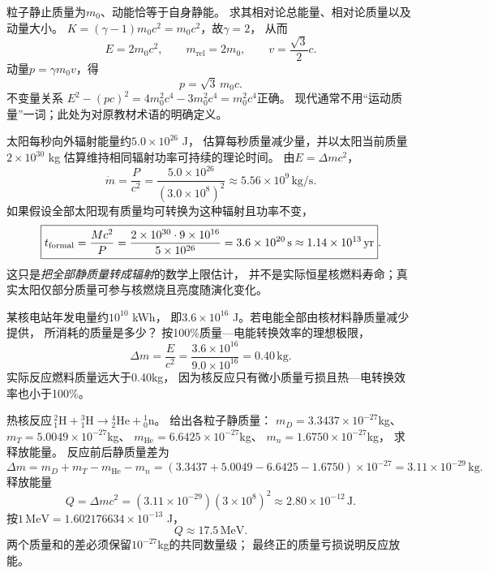 \problemtext 粒子静止质量为$m_0$、动能恰等于自身静能。
求其相对论总能量、相对论质量以及动量大小。
\workings
$K=(\gamma-1)m_0c^2=m_0c^2$，故$\gamma=2$，
从而
\[
\boxed{E=2m_0c^2},\qquad
\boxed{m_{\mathrm{rel}}=2m_0},\qquad
\boxed{v=\frac{\sqrt3}{2}c}.
\]
动量$p=\gamma m_0v$，得
\[
\boxed{p=\sqrt3\,m_0c}.
\]
\crosscheck 不变量关系
$E^2-(pc)^2=4m_0^2c^4-3m_0^2c^4=m_0^2c^4$正确。
现代通常不用“运动质量”一词；此处为对原教材术语的明确定义。

\problemtext 太阳每秒向外辐射能量约$5.0\times10^{26}$ J，
估算每秒质量减少量，并以太阳当前质量$2\times10^{30}$ kg
估算维持相同辐射功率可持续的理论时间。
\workings
由$E=\Delta mc^2$，
\[
\boxed{\dot m=\frac{P}{c^2}
=\frac{5.0\times10^{26}}{(3.0\times10^8)^2}
\approx5.56\times10^9\,\mathrm{kg/s}}.
\]
如果假设全部太阳现有质量均可转换为这种辐射且功率不变，
\[
\boxed{t_{\rm formal}=\frac{Mc^2}{P}
=\frac{2\times10^{30}\cdot9\times10^{16}}{5\times10^{26}}
=3.6\times10^{20}\,\mathrm s\approx1.14\times10^{13}\,\mathrm{yr}}.
\]
\crosscheck 这只是\emph{把全部静质量转成辐射}的数学上限估计，
并不是实际恒星核燃料寿命；真实太阳仅部分质量可参与核燃烧且亮度随演化变化。

\problemtext 某核电站年发电量约$10^{10}$ kWh，
即$3.6\times10^{16}$ J。若电能全部由核材料静质量减少提供，
所消耗的质量是多少？
\workings
按100\%质量—电能转换效率的理想极限，
\[
\boxed{\Delta m=\frac{E}{c^2}
=\frac{3.6\times10^{16}}{9.0\times10^{16}}
=0.40\,\mathrm{kg}}.
\]
\crosscheck 实际反应燃料质量远大于0.40kg，
因为核反应只有微小质量亏损且热—电转换效率也小于100\%。

\problemtext 热核反应$\,{}^{2}_{1}\mathrm H+{}^{3}_{1}\mathrm H
\to{}^{4}_{2}\mathrm{He}+{}^{1}_{0}\mathrm n$。
给出各粒子静质量：
$m_D=3.3437\times10^{-27}$kg、
$m_T=5.0049\times10^{-27}$kg、
$m_{\mathrm{He}}=6.6425\times10^{-27}$kg、
$m_n=1.6750\times10^{-27}$kg，
求释放能量。
\workings
反应前后静质量差为
\[
\Delta m=m_D+m_T-m_{\mathrm{He}}-m_n
=(3.3437+5.0049-6.6425-1.6750)\times10^{-27}
=3.11\times10^{-29}\,\mathrm{kg}.
\]
释放能量
\[
\boxed{Q=\Delta mc^2
=(3.11\times10^{-29})(3\times10^8)^2
\approx2.80\times10^{-12}\,\mathrm J}.
\]
按$1\,\mathrm{MeV}=1.602176634\times10^{-13}$ J，
\[
\boxed{Q\approx17.5\,\mathrm{MeV}}.
\]
\crosscheck 两个质量和的差必须保留$10^{-27}$kg的共同数量级；
最终正的质量亏损说明反应放能。
